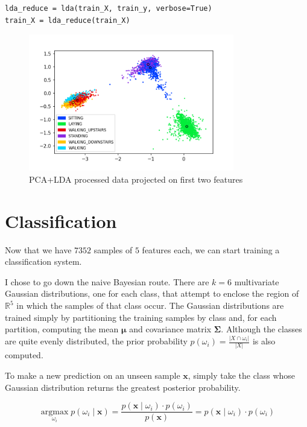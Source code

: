 \documentclass[14pt]{extarticle}
\begin{document}
    \begin{verbatim}
lda_reduce = lda(train_X, train_y, verbose=True)
train_X = lda_reduce(train_X)
    \end{verbatim}

    \begin{figure}[H]
        \centering
        \includegraphics[width=0.8\textwidth]{img/lda_1.png}
        \caption{PCA+LDA processed data projected on first two features}
    \end{figure}

    \section{Classification}
    Now that we have $7352$ samples of $5$ features each, we can start training
    a classification system.

    I chose to go down the naive Bayesian route. There are $k=6$ multivariate
    Gaussian distributions, one for each class, that attempt to enclose the
    region of $\mathbb{R}^5$ in which the samples of that class occur. The
    Gaussian distributions are trained simply by partitioning the training
    samples by class and, for each partition, computing the mean $\boldsymbol{\mu}$ and
    covariance matrix $\boldsymbol{\Sigma}$. Although the classes are quite
    evenly distributed, the prior probability $p(\omega_i)=\frac{|X\cap\omega_i|}{|X|}$
    is also computed.

    To make a new prediction on an unseen sample $\boldsymbol{x}$, simply take
    the class whose Gaussian distribution returns the greatest posterior probability.

    \[
      \operatorname*{argmax}_{\omega_i} p(\omega_i\mid\boldsymbol{x}) =
      \frac{p(\boldsymbol{x}\mid\omega_i)\cdot p(\omega_i)}{p(\boldsymbol{x})} =
      p(\boldsymbol{x}\mid\omega_i)\cdot p(\omega_i)
    \]
\end{document}
